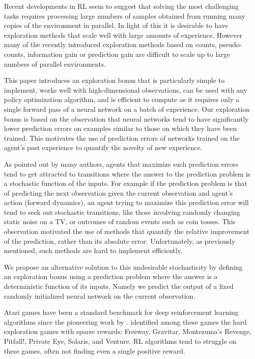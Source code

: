 \documentclass{article} \usepackage[dvipsnames]{xcolor}
\begin{document}
Recent developments in RL seem to suggest that solving the most challenging tasks \citep{SilverHuangEtAl16nature,zoph2016neural,horgan2018distributed,espeholt2018impala,openai2018dota,openai2018dexterous} requires processing large numbers of samples obtained from running many copies of the environment in parallel. In light of this it is desirable to have exploration methods that scale well with large amounts of experience. However many of the recently introduced exploration methods based on counts, pseudo-counts, information gain or prediction gain are difficult to scale up to large numbers of parallel environments.

This paper introduces an exploration bonus that is particularly simple to implement, works well with high-dimensional observations, can be used with any policy optimization algorithm, and is efficient to compute as it requires only a single forward pass of a neural network on a batch of experience. Our exploration bonus is based on the observation that neural networks tend to have significantly lower prediction errors on examples similar to those on which they have been trained. This motivates the use of prediction errors of networks trained on the agent's past experience to quantify the novelty of new experience.

As pointed out by many authors, agents that maximize such prediction errors tend to get attracted to transitions where the answer to the prediction problem is a stochastic function of the inputs. For example if the prediction problem is that of predicting the next observation given the current observation and agent's action (forward dynamics), an agent trying to maximize this prediction error will tend to seek out stochastic transitions, like those involving randomly changing static noise on a TV, or outcomes of random events such as coin tosses. This observation motivated the use of methods that quantify the relative improvement of the prediction, rather than its absolute error. Unfortunately, as previously mentioned, such methods are hard to implement efficiently.

We propose an alternative solution to this undesirable stochasticity by defining an exploration bonus using a prediction problem where the answer is a deterministic function of its inputs. Namely we predict the output of a fixed randomly initialized neural network on the current observation.

Atari games have been a standard benchmark for deep reinforcement learning algorithms since the pioneering work by \cite{mnih2013playing}. \cite{bellemare2016unifying} identified among these games the hard exploration games with sparse rewards: Freeway, Gravitar, Montezuma's Revenge, Pitfall!, Private Eye, Solaris, and Venture. RL algorithms tend to struggle on these games, often not finding even a single positive reward.
\end{document}
